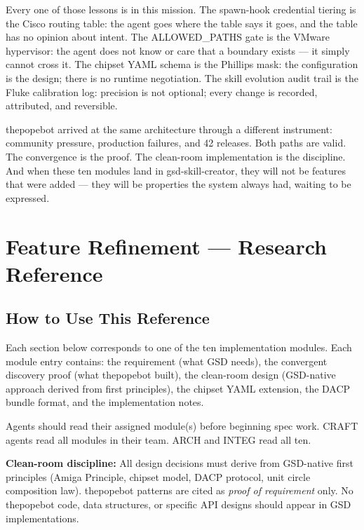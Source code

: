 \documentclass[11pt,letterpaper]{article}
\newcommand{\stageheader}[2]{%
  \noindent\colorbox{#2}{\makebox[\textwidth][l]{%
    \textcolor{white}{\bfseries\sffamily\hspace{6pt}#1\hspace{6pt}}}}%
  \vspace{0.5em}\par%
}
\begin{document}
Every one of those lessons is in this mission. The spawn-hook credential tiering is the Cisco routing table: the agent goes where the table says it goes, and the table has no opinion about intent. The ALLOWED\_PATHS gate is the VMware hypervisor: the agent does not know or care that a boundary exists --- it simply cannot cross it. The chipset YAML schema is the Phillips mask: the configuration is the design; there is no runtime negotiation. The skill evolution audit trail is the Fluke calibration log: precision is not optional; every change is recorded, attributed, and reversible.

thepopebot arrived at the same architecture through a different instrument: community pressure, production failures, and 42 releases. Both paths are valid. The convergence is the proof. The clean-room implementation is the discipline. And when these ten modules land in gsd-skill-creator, they will not be features that were added --- they will be properties the system always had, waiting to be expressed.

\newpage

\stageheader{STAGE 2 --- RESEARCH REFERENCE}{secondary}

\section{Feature Refinement --- Research Reference}

\subsection{How to Use This Reference}

Each section below corresponds to one of the ten implementation modules. Each module entry contains: the requirement (what GSD needs), the convergent discovery proof (what thepopebot built), the clean-room design (GSD-native approach derived from first principles), the chipset YAML extension, the DACP bundle format, and the implementation notes.

Agents should read their assigned module(s) before beginning spec work. CRAFT agents read all modules in their team. ARCH and INTEG read all ten.

\textbf{Clean-room discipline:} All design decisions must derive from GSD-native first principles (Amiga Principle, chipset model, DACP protocol, unit circle composition law). thepopebot patterns are cited as \textit{proof of requirement} only. No thepopebot code, data structures, or specific API designs should appear in GSD implementations.
\end{document}
